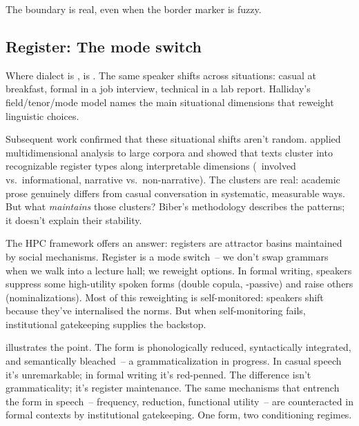 The boundary is real, even when the border marker is fuzzy.

\subsection{Register: The mode switch}
\label{sec:16:register}

Where dialect is ,  is  \citep{halliday1978}. The same speaker shifts across situations: casual at breakfast, formal in a job interview, technical in a lab report. Halliday's field/tenor/mode model names the main situational dimensions that reweight linguistic choices.

Subsequent work confirmed that these situational shifts aren't random. \textcite{biber1988} applied multidimensional analysis to large corpora and showed that texts cluster into recognizable register types along interpretable dimensions (\eg\ involved vs.\ informational, narrative vs.\ non-narrative). The clusters are real: academic prose genuinely differs from casual conversation in systematic, measurable ways. But what \emph{maintains} those clusters? Biber's methodology describes the patterns; it doesn't explain their stability.

The HPC framework offers an answer: registers are attractor basins maintained by social mechanisms. Register is a mode switch~-- we don't swap grammars when we walk into a lecture hall; we reweight options. In formal writing, speakers suppress some high-utility spoken forms (double copula, -passive) and raise others (nominalizations). Most of this reweighting is self-monitored: speakers shift because they've internalised the norms. But when self-monitoring fails, institutional gatekeeping supplies the backstop.

 illustrates the point. The form is phonologically reduced, syntactically integrated, and semantically bleached~-- a grammaticalization in progress. In casual speech it's unremarkable; in formal writing it's red-penned. The difference isn't grammaticality; it's register maintenance. The same mechanisms that entrench the form in speech~-- frequency, reduction, functional utility~-- are counteracted in formal contexts by institutional gatekeeping. One form, two conditioning regimes.

